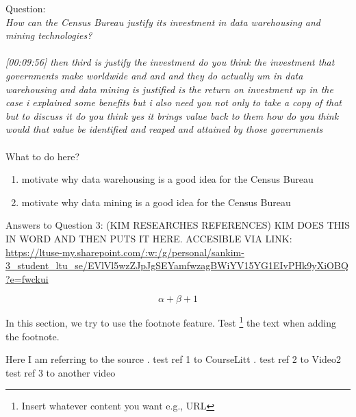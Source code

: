Question:\\
\emph{
    How can the Census Bureau justify its investment in data warehousing and mining
technologies?
}\\\\

\emph{[00:09:56] then third is justify the investment do you think the investment that governments make worldwide
and and and they do actually um in data warehousing and data mining is justified is the return on investment
up in the case i explained some benefits but i also need you not only to take a copy of that but
to discuss it do you think yes it brings value back to them how do you think would that value be
identified and reaped and attained by those governments}\\\\

What to do here?
\begin{enumerate}
    \item motivate why data warehousing is a good idea for the Census Bureau
    \item motivate why data mining is a good idea for the Census Bureau
  \end{enumerate}

\newpage Answers to Question 3: (KIM RESEARCHES REFERENCES)
KIM DOES THIS IN WORD AND THEN PUTS IT HERE. ACCESIBLE VIA LINK:\\
\url{https://ltuse-my.sharepoint.com/:w:/g/personal/sankim-3_student_ltu_se/EVlVl5wzZJpJgSEYamfwzagBWiYV15YG1EIvPHk9yXiOBQ?e=fwckui}

\newpage 
\begin{equation}
\alpha + \beta + 1
\end{equation}

In this section, we try to use the footnote feature. 
Test \footnote{Insert whatever content you want e.g., URL} the text when adding the footnote.

Here I am referring to the source \cite{DataScience}.
test ref 1 to CourseLitt \cite{CourseLitt}.
test ref 2 to Video2 \cite{l2video}
test ref 3 to another video \cite{l3video}